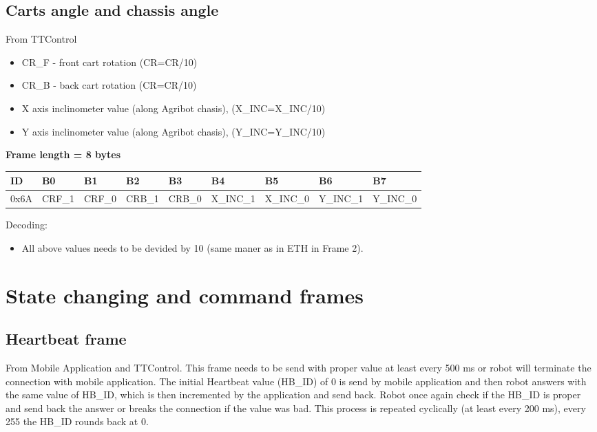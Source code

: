 \documentclass{article}
\begin{document}
\subsection{Carts angle and chassis angle}
From TTControl
\begin{itemize}
    \item CR\_F - front cart rotation (CR=CR/10)
    \item CR\_B - back cart rotation (CR=CR/10)
    \item X axis inclinometer value (along Agribot chasis), (X\_INC=X\_INC/10)
    \item Y axis inclinometer value (along Agribot chasis), (Y\_INC=Y\_INC/10)
\end{itemize}{}

\textbf{Frame length = 8 bytes}
\begin{center}
    \begin{tabular}{| p{20pt} | p{40pt} | p{40pt} | p{40pt} | p{40pt} | p{40pt} | p{40pt} | p{40pt} | p{40pt} |}
        \hline
        ID   & B0     & B1     & B2     & B3     & B4        & B5        & B6        & B7        \\
        \hline
        0x6A & CRF\_1 & CRF\_0 & CRB\_1 & CRB\_0 & X\_INC\_1 & X\_INC\_0 & Y\_INC\_1 & Y\_INC\_0 \\
        \hline
    \end{tabular}

\end{center}
Decoding:
\begin{itemize}
    \item All above values needs to be devided by 10 (same maner as in ETH in Frame 2).
\end{itemize}


\newpage
\section{State changing and command frames}
\subsection{Heartbeat frame}
From Mobile Application and TTControl. This frame needs to be send with proper value at least every 500 ms or robot will terminate the connection with mobile application. The initial Heartbeat value (HB\_ID) of 0 is send by mobile application and then robot answers with the same value of HB\_ID, which is then incremented by the application and send back. Robot once again check if the HB\_ID is proper and send back the answer or breaks the connection if the value was bad. This process is repeated cyclically (at least every 200 ms), every 255 the HB\_ID rounds back at 0.
\end{document}
